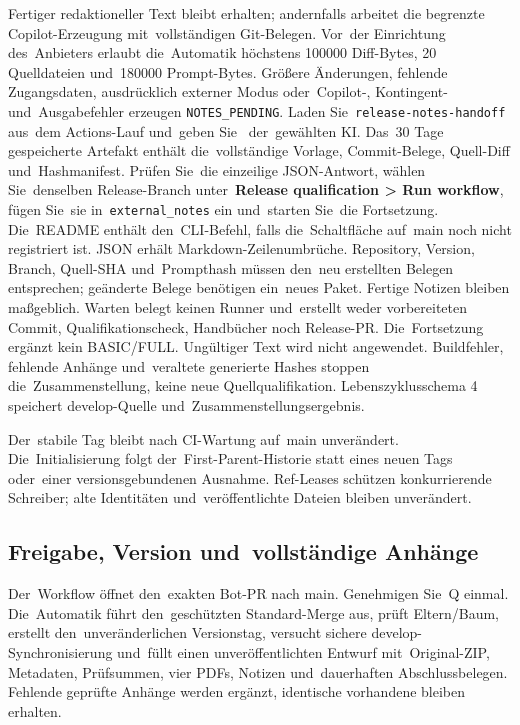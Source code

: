 \documentclass[11pt,a4paper]{article}
\newcommand{\filepath}[1]{\path{#1}}
\newcommand{\ui}[1]{\textbf{#1}}
\newcommand{\codeword}[1]{\nolinkurl{#1}}
\begin{document}
Fertiger redaktioneller Text bleibt erhalten; andernfalls arbeitet die
begrenzte Copilot-Erzeugung mit~vollständigen Git-Belegen. Vor~der Einrichtung
des~Anbieters erlaubt die~Automatik höchstens 100000 Diff-Bytes, 20 Quelldateien
und~180000 Prompt-Bytes. Größere Änderungen, fehlende Zugangsdaten, ausdrücklich
externer Modus oder~Copilot-, Kontingent- und~Ausgabefehler erzeugen
\codeword{NOTES_PENDING}. Laden Sie~\codeword{release-notes-handoff} aus~dem
Actions-Lauf und~geben Sie~\filepath{prompt.txt} der~gewählten KI.
Das~30 Tage gespeicherte Artefakt enthält die~vollständige Vorlage,
Commit-Belege, Quell-Diff und~Hashmanifest. Prüfen Sie~die einzeilige
JSON-Antwort, wählen Sie~denselben Release-Branch unter~\ui{Release
qualification > Run workflow}, fügen Sie~sie in~\codeword{external_notes}
ein und~starten Sie~die Fortsetzung. Die~README enthält den~CLI-Befehl, falls
die~Schaltfläche auf~main noch nicht registriert ist. JSON erhält
Markdown-Zeilenumbrüche. Repository, Version, Branch, Quell-SHA und~Prompthash
müssen den~neu erstellten Belegen entsprechen; geänderte Belege benötigen
ein~neues Paket. Fertige Notizen bleiben maßgeblich. Warten belegt keinen
Runner und~erstellt weder vorbereiteten Commit, Qualifikationscheck,
Handbücher noch Release-PR. Die~Fortsetzung ergänzt kein BASIC/FULL.
Ungültiger Text wird nicht angewendet. Buildfehler, fehlende Anhänge
und~veraltete generierte
Hashes stoppen die~Zusammenstellung, keine neue Quellqualifikation.
Lebenszyklusschema 4 speichert develop-Quelle und~Zusammenstellungsergebnis.

Der~stabile Tag bleibt nach CI-Wartung auf~main unverändert.
Die~Initialisierung folgt der~First-Parent-Historie statt eines neuen Tags
oder~einer versionsgebundenen Ausnahme. Ref-Leases schützen konkurrierende
Schreiber; alte Identitäten und~veröffentlichte Dateien bleiben unverändert.

\subsection{Freigabe, Version und~vollständige Anhänge}

Der~Workflow öffnet den~exakten Bot-PR nach main. Genehmigen Sie~Q einmal.
Die~Automatik führt den~geschützten Standard-Merge aus, prüft Eltern/Baum,
erstellt den~unveränderlichen Versionstag, versucht sichere
develop-Synchronisierung
und~füllt einen unveröffentlichten Entwurf mit~Original-ZIP, Metadaten,
Prüfsummen, vier PDFs, Notizen und~dauerhaften Abschlussbelegen.
Fehlende geprüfte Anhänge werden ergänzt, identische vorhandene bleiben
erhalten.
\end{document}
